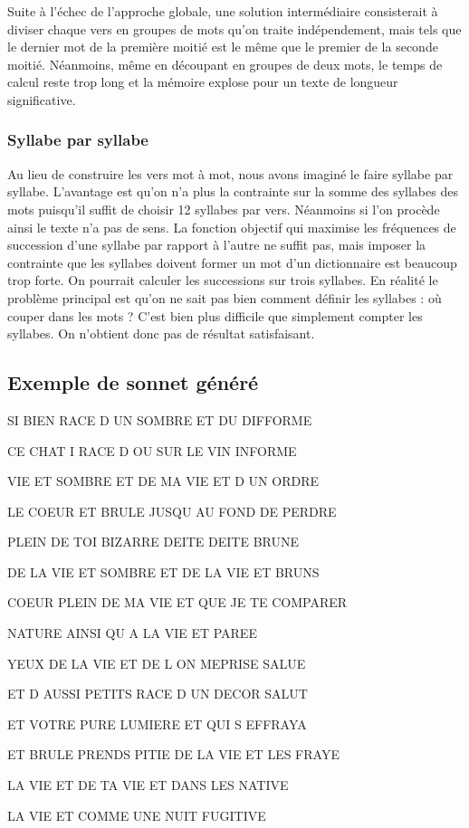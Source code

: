 \documentclass[a4paper,11pt]{article}
\begin{document}
Suite à l'échec de l'approche globale, une solution intermédiaire consisterait à diviser chaque vers en groupes de mots qu'on traite indépendement, mais tels que le dernier mot de la première moitié est le même que le premier de la seconde moitié. Néanmoins, même en découpant en groupes de deux mots, le temps de calcul reste trop long et la mémoire explose pour un texte de longueur significative.


\subsubsection{Syllabe par syllabe}

Au lieu de construire les vers mot à mot, nous avons imaginé le faire syllabe par syllabe. L'avantage est qu'on n'a plus la contrainte sur la somme des syllabes des mots puisqu'il suffit de choisir 12 syllabes par vers. Néanmoins si l'on procède ainsi le texte n'a pas de sens. La fonction objectif qui maximise les fréquences de succession d'une syllabe par rapport à l'autre ne suffit pas, mais imposer la contrainte que les syllabes doivent former un mot d'un dictionnaire est beaucoup trop forte. On pourrait calculer les successions sur trois syllabes. En réalité le problème principal est qu'on ne sait pas bien comment définir les syllabes : où couper dans les mots ? C'est bien plus difficile que simplement compter les syllabes. On n'obtient donc pas de résultat satisfaisant.

\subsection{Exemple de sonnet généré}

\begin{footnotesize}
\begin{itshape}
 SI BIEN RACE D UN SOMBRE ET DU DIFFORME

 CE CHAT I RACE D OU SUR LE VIN INFORME

 VIE ET SOMBRE ET DE MA VIE ET D UN ORDRE

 LE COEUR ET BRULE JUSQU AU FOND DE PERDRE
\medskip

 PLEIN DE TOI BIZARRE DEITE DEITE BRUNE

 DE LA VIE ET SOMBRE ET DE LA VIE ET BRUNS

 COEUR PLEIN DE MA VIE ET QUE JE TE COMPARER
 
 NATURE AINSI QU A LA VIE ET PAREE
\medskip

 YEUX DE LA VIE ET DE L ON MEPRISE SALUE
 
 ET D AUSSI PETITS RACE D UN DECOR SALUT
 
 ET VOTRE PURE LUMIERE ET QUI S EFFRAYA
\medskip

 ET BRULE PRENDS PITIE DE LA VIE ET LES FRAYE
 
 LA VIE ET DE TA VIE ET DANS LES NATIVE
 
 LA VIE ET COMME UNE NUIT FUGITIVE

\end{itshape}
\end{footnotesize}

 
\end{document}
